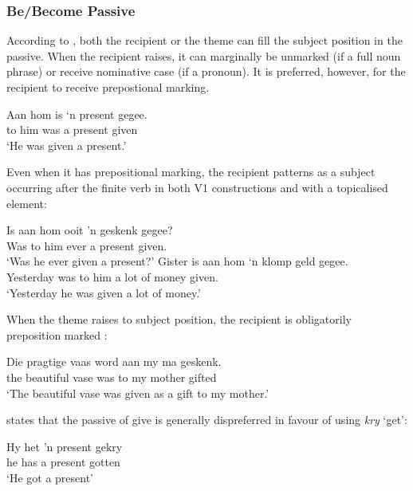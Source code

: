 \subsubsection{Be/Become Passive}
According to \citep{Stadler.1996}, both the recipient or the theme can fill the subject position in the passive. When the recipient raises, it can marginally be unmarked (if a full noun phrase) or receive nominative case (if a pronoun). It is preferred, however, for the recipient to receive prepostional marking.
\begin{exe}
\ex 
\begin{xlist}
\ex \gll Aan hom is `n present gegee.\\
to him was a present given\\
\trans `He was given a present.'
\end{xlist}
\end{exe}
Even when it has prepositional marking, the recipient patterns as a subject occurring after the finite verb in both V1 constructions and with a topicalised element:
\begin{exe}
\ex
\begin{xlist}
\ex \gll Is aan hom ooit 'n geskenk gegee?\\
Was to him ever a present given.\\
\trans `Was he ever given a present?'
\ex \gll Gister is aan hom `n klomp geld gegee.\\
Yesterday was to him a {lot of} money given.\\
\trans `Yesterday he was given a lot of money.'
\end{xlist}
\end{exe}
When the theme raises to subject position, the recipient is obligatorily preposition marked \citep{Stadler.1996}:
\begin{exe}
\ex
\begin{xlist}
\ex \gll Die pragtige vaas word aan my ma geskenk.\\
the beautiful vase was to my mother gifted\\
\trans `The beautiful vase was given as a gift to my mother.'
\end{xlist}
\end{exe}
\cite{Ponelis.1979} states that the passive of give is generally dispreferred in favour of using \emph{kry} `get':
\begin{exe}
\ex
\begin{xlist}
\ex \gll Hy het 'n present gekry\\
he has a present gotten\\
\trans `He got a present'
\end{xlist}
\end{exe}
